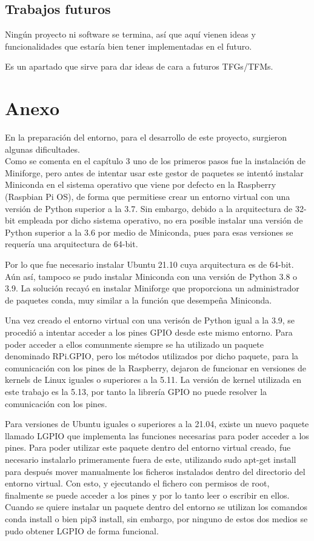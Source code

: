 \documentclass[a4paper, 12pt]{book}
\begin{document}
\section{Trabajos futuros}
\label{sec:trabajos_futuros}

Ningún proyecto ni software se termina, así que aquí vienen ideas y funcionalidades que estaría bien tener implementadas en el futuro.

Es un apartado que sirve para dar ideas de cara a futuros TFGs/TFMs.

\chapter{Anexo}
\label{chap:anexo}

En la preparación del entorno, para el desarrollo de este proyecto, surgieron algunas dificultades.\\

Como se comenta en el capítulo 3 uno de los primeros pasos fue la instalación de Miniforge, pero antes de intentar usar este gestor de paquetes se intentó instalar Miniconda en el sistema operativo que viene por defecto en la Raspberry (Raspbian Pi OS), de forma que permitiese crear un entorno virtual con una versión de Python superior a la 3.7. Sin embargo, debido a la arquitectura de 32-bit empleada por dicho sistema operativo, no era posible instalar una versión de Python superior a la 3.6 por medio de Miniconda, pues para esas versiones se requería una arquitectura de 64-bit.

Por lo que fue necesario instalar Ubuntu 21.10 cuya arquitectura es de 64-bit. Aún así, tampoco se pudo instalar Miniconda con una versión de Python 3.8 o 3.9. La solución recayó en instalar Miniforge que proporciona un administrador de paquetes conda, muy similar a la función que desempeña Miniconda.

Una vez creado el entorno virtual con una verisón de Python igual a la 3.9, se procedió a intentar acceder a los pines GPIO desde este mismo entorno. Para poder acceder a ellos comunmente siempre se ha utilizado un paquete denominado RPi.GPIO, pero los métodos utilizados por dicho paquete, para la comunicación con los pines de la Raspberry, dejaron de funcionar en versiones de kernels de Linux iguales o superiores a la 5.11. La versión de kernel utilizada en este trabajo es la 5.13, por tanto la librería GPIO no puede resolver la comunicación con los pines.

Para versiones de Ubuntu iguales o superiores a la 21.04, existe un nuevo paquete llamado LGPIO que implementa las funciones necesarias para poder acceder a los pines. Para poder utilizar este paquete dentro del entorno virtual creado, fue necesario instalarlo primeramente fuera de este, utilizando sudo apt-get install para después mover manualmente los ficheros instalados dentro del directorio del entorno virtual. Con esto, y ejecutando el fichero con permisos de root, finalmente se puede acceder a los pines y por lo tanto leer o escribir en ellos.\\
Cuando se quiere instalar un paquete dentro del entorno se utilizan los comandos conda install o bien pip3 install, sin embargo, por ninguno de estos dos medios se pudo obtener LGPIO de forma funcional.
\end{document}
